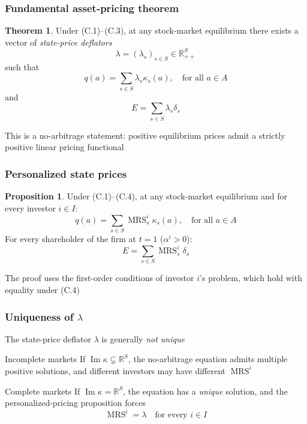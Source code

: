 \documentclass[blue]{beamer}
\def\R{\mathbb{R}}
\DeclareMathOperator\MRS{MRS}
\DeclareMathOperator\Range{Im}
\theoremstyle{definition}
\theoremstyle{example}
\newtheorem*{proposition}{Proposition}
\newtheorem*{theoremns}{Theorem}
\begin{document}
\begin{frame}\frametitle{Fundamental asset-pricing theorem}
\begin{theoremns}
Under (C.1)--(C.3), at any stock-market equilibrium there exists a vector of \emph{state-price deflators}
\begin{equation*}
\lambda = (\lambda_s)_{s \in S} \in \R^{S}_{++}
\end{equation*}
such that
\begin{equation*}
q(a) = \sum_{s \in S} \lambda_s \kappa_s(a), \quad \text{for all $a \in A$}
\end{equation*}
and
\begin{equation*}
E = \sum_{s \in S} \lambda_s \delta_s
\end{equation*}
\end{theoremns}
\bigskip

This is a no-arbitrage statement: positive equilibrium prices admit a strictly positive linear pricing functional
\end{frame}

\begin{frame}\frametitle{Personalized state prices}
\begin{proposition}
Under (C.1)--(C.4), at any stock-market equilibrium and for every investor $i \in I$:
\begin{equation*}
q(a) = \sum_{s \in S} \MRS^i_s \kappa_s(a), \quad \text{for all $a \in A$}
\end{equation*}
For every shareholder of the firm at $t=1$ ($\alpha^i > 0$):
\begin{equation*}
E = \sum_{s \in S} \MRS^i_s \delta_s
\end{equation*}
\end{proposition}
\bigskip

The proof uses the first-order conditions of investor $i$'s problem, which hold with equality under (C.4)
\end{frame}

\begin{frame}\frametitle{Uniqueness of $\lambda$}
The state-price deflator $\lambda$ is generally \emph{not unique}
\bigskip

\begin{block}{Incomplete markets}
If $\Range \kappa \subsetneq \R^S$, the no-arbitrage equation admits multiple positive solutions, and different investors may have different $\MRS^i$
\end{block}

\begin{block}{Complete markets}
If $\Range \kappa = \R^S$, the equation has a \emph{unique} solution, and the personalized-pricing proposition forces
\begin{equation*}
\MRS^i = \lambda \quad \text{for every $i\in I$}
\end{equation*}
\end{block}
\end{frame}
\end{document}
